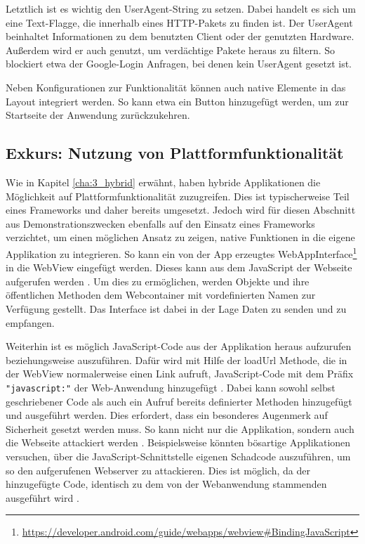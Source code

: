 Letztlich ist es wichtig den UserAgent-String zu setzen. Dabei handelt es sich um eine Text-Flagge, die innerhalb eines HTTP-Pakets zu finden ist. Der UserAgent beinhaltet Informationen zu dem benutzten Client oder der genutzten Hardware. Außerdem wird er auch genutzt, um verdächtige Pakete heraus zu filtern\cite{UserAgentString}. So blockiert etwa der Google-Login Anfragen, bei denen kein UserAgent gesetzt ist.

Neben Konfigurationen zur Funktionalität können auch native Elemente in das Layout integriert werden. So kann etwa ein Button hinzugefügt werden, um zur Startseite der Anwendung zurückzukehren.
\\
\subsection{Exkurs: Nutzung von Plattformfunktionalität}
Wie in Kapitel \ref{cha:3_hybrid} erwähnt, haben hybride Applikationen die Möglichkeit auf Plattformfunktionalität zuzugreifen. 
Dies ist typischerweise Teil eines Frameworks und daher bereits umgesetzt.
Jedoch wird für diesen Abschnitt aus Demonstrationszwecken ebenfalls auf den Einsatz eines Frameworks verzichtet, um einen möglichen Ansatz zu zeigen, native Funktionen in die eigene Applikation zu integrieren. So kann ein von der App erzeugtes WebAppInterface\footnote{\url{https://developer.android.com/guide/webapps/webview\#BindingJavaScript}} in die WebView eingefügt werden. Dieses kann aus dem JavaScript der Webseite aufgerufen werden \cite{webview_javascript_security}. Um dies zu ermöglichen, werden Objekte und ihre öffentlichen Methoden dem Webcontainer mit vordefinierten Namen zur Verfügung gestellt. Das Interface ist dabei in der Lage Daten zu senden und zu empfangen.

Weiterhin ist es möglich JavaScript-Code aus der Applikation heraus aufzurufen beziehungsweise auszuführen. Dafür wird mit Hilfe der loadUrl Methode, die in der WebView normalerweise einen Link aufruft, JavaScript-Code mit dem Präfix \verb|"javascript:"| der Web-Anwendung hinzugefügt \cite{webview_javascript_security}.
Dabei kann sowohl selbst geschriebener Code als auch ein Aufruf bereits definierter Methoden hinzugefügt und ausgeführt werden.
Dies erfordert, dass ein besonderes Augenmerk auf Sicherheit gesetzt werden muss. So kann nicht nur die Applikation, sondern auch die Webseite attackiert werden \cite{webview_javascript_security}. 
Beispielsweise könnten bösartige Applikationen versuchen, über die JavaScript-Schnittstelle eigenen Schadcode auszuführen, um so den aufgerufenen Webserver zu attackieren. Dies ist möglich, da der hinzugefügte Code, identisch zu dem von der Webanwendung stammenden ausgeführt wird \cite{webview_javascript_security}.

